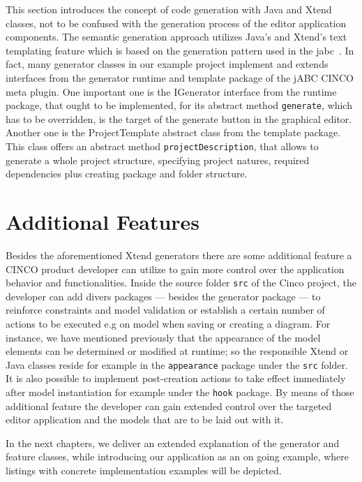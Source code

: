 This section introduces the concept of code generation with Java and Xtend classes, not to be confused with the generation process of the editor application components. The semantic generation approach utilizes Java's and Xtend's text templating feature which is based on the generation pattern used in the \acrfull{jabc}~\cite{model-driver-dev_jABC,jabc-home}. In fact, many generator classes in our example project implement and extends interfaces from the generator runtime and template package of the jABC CINCO meta plugin. One important one is the IGenerator interface from the runtime package, that ought to be implemented, for its abstract method \lstinline{generate}, which has to be overridden, is the target of the generate button in the graphical editor. Another one is the ProjectTemplate abstract class from the template package. This class offers an abstract method \lstinline{projectDescription}, that allows to generate a whole project structure, specifying project natures, required dependencies plus creating package and folder structure.

\section[]{Additional Features}

Besides the aforementioned Xtend generators there are some additional feature a CINCO product developer can utilize to gain more control over the application behavior and functionalities. Inside the source folder \lstinline{src} of the Cinco project, the developer can add divers packages --- besides the generator package --- to reinforce constraints and model validation or establish a certain number of actions to be executed e.g on model when saving or creating a diagram. For instance, we have mentioned previously that the appearance of the model elements can be determined or modified at runtime; so the responsible Xtend or Java classes reside for example in the \lstinline{appearance} package under the \lstinline{src} folder. It is also possible to implement post-creation actions to take effect immediately after model instantiation for example under the \lstinline{hook} package. By means of those additional feature the developer can gain extended control over the targeted editor application and the models that are to be laid out with it. 

In the next chapters, we deliver an extended explanation of the generator and feature classes, while introducing our application as an on going example, where listings with concrete implementation examples will be depicted.